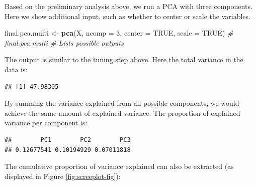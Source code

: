 \documentclass[]{book}
\newenvironment{Shaded}{\begin{snugshade}}{\end{snugshade}}
\newcommand{\KeywordTok}[1]{\textcolor[rgb]{0.13,0.29,0.53}{\textbf{#1}}}
\newcommand{\DataTypeTok}[1]{\textcolor[rgb]{0.13,0.29,0.53}{#1}}
\newcommand{\DecValTok}[1]{\textcolor[rgb]{0.00,0.00,0.81}{#1}}
\newcommand{\StringTok}[1]{\textcolor[rgb]{0.31,0.60,0.02}{#1}}
\newcommand{\CommentTok}[1]{\textcolor[rgb]{0.56,0.35,0.01}{\textit{#1}}}
\newcommand{\OtherTok}[1]{\textcolor[rgb]{0.56,0.35,0.01}{#1}}
\newcommand{\OperatorTok}[1]{\textcolor[rgb]{0.81,0.36,0.00}{\textbf{#1}}}
\newcommand{\NormalTok}[1]{#1}
\begin{document}
Based on the preliminary analysis above, we run a PCA with three
components. Here we show additional input, such as whether to center or
scale the variables.

\begin{Shaded}
\begin{Highlighting}[]
\NormalTok{final.pca.multi <-}\StringTok{ }\KeywordTok{pca}\NormalTok{(X, }\DataTypeTok{ncomp =} \DecValTok{3}\NormalTok{, }\DataTypeTok{center =} \OtherTok{TRUE}\NormalTok{, }\DataTypeTok{scale =} \OtherTok{TRUE}\NormalTok{)}
\CommentTok{# final.pca.multi  # Lists possible outputs}
\end{Highlighting}
\end{Shaded}

The output is similar to the tuning step above. Here the total variance
in the data is:

\begin{Shaded}
\end{Shaded}

\begin{verbatim}
## [1] 47.98305
\end{verbatim}

By summing the variance explained from all possible components, we would
achieve the same amount of explained variance. The proportion of
explained variance per component is:

\begin{Shaded}
\end{Shaded}

\begin{verbatim}
##        PC1        PC2        PC3 
## 0.12677541 0.10194929 0.07011818
\end{verbatim}

The cumulative proportion of variance explained can also be extracted
(as displayed in Figure \ref{fig:screeplot-fig}):

\begin{Shaded}
\end{Shaded}
\end{document}
